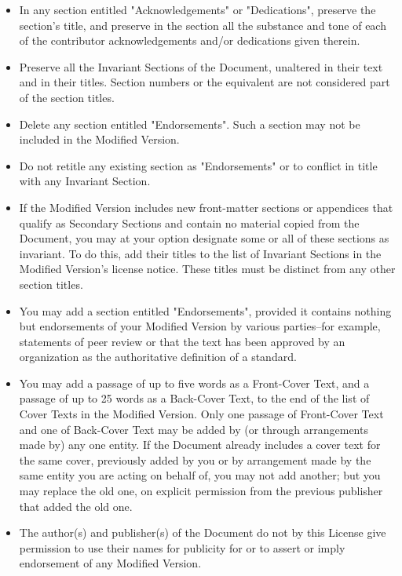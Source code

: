 \begin{itemize}
		\item In any section entitled "Acknowledgements" or "Dedications", preserve the section's title, and preserve in the section all the substance and tone of each of the contributor acknowledgements and/or dedications given therein. 

		\item Preserve all the Invariant Sections of the Document, unaltered in their text and in their titles. Section numbers or the equivalent are not considered part of the section titles. 

		\item Delete any section entitled "Endorsements". Such a section may not be included in the Modified Version. 

		\item Do not retitle any existing section as "Endorsements" or to conflict in title with any Invariant Section.

		\item If the Modified Version includes new front-matter sections or appendices that qualify as Secondary Sections and contain no material copied from the Document, you may at your option designate some or all of these sections as invariant. To do this, add their titles to the list of Invariant Sections in the Modified Version's license notice. These titles must be distinct from any other section titles. 

		\item You may add a section entitled "Endorsements", provided it contains nothing but endorsements of your Modified Version by various parties--for example, statements of peer review or that the text has been approved by an organization as the authoritative definition of a standard. 

		\item You may add a passage of up to five words as a Front-Cover Text, and a passage of up to 25 words as a Back-Cover Text, to the end of the list of Cover Texts in the Modified Version. Only one passage of Front-Cover Text and one of Back-Cover Text may be added by (or through arrangements made by) any one entity. If the Document already includes a cover text for the same cover, previously added by you or by arrangement made by the same entity you are acting on behalf of, you may not add another; but you may replace the old one, on explicit permission from the previous publisher that added the old one. 

		\item The author(s) and publisher(s) of the Document do not by this License give permission to use their names for publicity for or to assert or imply endorsement of any Modified Version.
	\end{itemize} 


